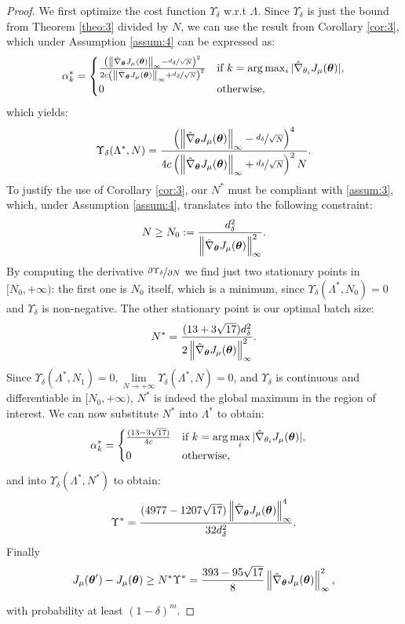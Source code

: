 \begin{proof}
We first optimize the cost function $\Upsilon_{\delta}$ w.r.t $\Lambda$. Since $\Upsilon_{\delta}$ is just the bound from Theorem \ref{theo:3} divided by $N$, we can use the result from Corollary \ref{cor:3}, which under Assumption \ref{assum:4} can be expressed as:
\[
\alpha_k^* = 
\begin{cases}
	\frac{
		\left(\norm[\infty]{\gradApp{\vtheta}} - \nicefrac{d_{\delta}}{\sqrt{N}}\right)^2}
		{2c
		\left(\norm[\infty]{\gradApp{\vtheta}} + \nicefrac{d_{\delta}}{\sqrt{N}}\right)^2} & 
		\text{if } k = \arg\max_i |\gradApp{\theta_i}|,	\\
		0 & \text{otherwise},
\end{cases}
\]
which yields:
\[
	\Upsilon_{\delta}(\Lambda^*,N) = 
	\frac{
		\left(\norm[\infty]{\gradApp{\vtheta}} - \nicefrac{d_{\delta}}{\sqrt{N}}\right)^4}
		{4c
		\left(\norm[\infty]{\gradApp{\vtheta}} + \nicefrac{d_{\delta}}{\sqrt{N}}\right)^2N}.
\]
To justify the use of Corollary \ref{cor:3}, our $N^*$ must be compliant with \ref{assum:3}, which, under Assumption \ref{assum:4}, translates into the following constraint:
\[
N \geq N_0 := \frac{d_{\delta}^2}{\norm[\infty]{\gradApp{\vtheta}}^2}.
\] 
By computing the derivative $\nicefrac{\partial\Upsilon_{\delta}}{\partial N}$ we find just two stationary points in $[N_0,+\infty)$: the first one is $N_0$ itself, which is a minimum, since $\Upsilon_{\delta}(\Lambda^*,N_0) = 0$ and $\Upsilon_{\delta}$ is non-negative. The other stationary point is our optimal batch size:
\[
	N^* =  \frac{(13+3\sqrt{17})d_{\delta}^2}{2\norm[\infty]{\gradApp{\vtheta}}^2}.
\]
Since $\Upsilon_{\delta}(\Lambda^*,N_1)=0, \lim\limits_{N \to +\infty}\Upsilon_{\delta} (\Lambda^*,N)= 0$, and $\Upsilon_{\delta}$ is continuous and differentiable in $[N_0,+\infty)$, $N^*$ is indeed the global maximum in the region of interest. We can now substitute $N^*$ into $\Lambda^*$ to obtain:
\begin{align*}
&\alpha_k^* = 
\begin{cases}  
	\frac{(13-3\sqrt{17})}
		{4c} & 
		\text{if } k = \arg\max\limits_i |\gradApp{\theta_i}|,	\\
		0 & \text{otherwise},
\end{cases}
\end{align*}
and into $\Upsilon_{\delta}(\Lambda^*,N^*)$ to obtain:
\[
	\Upsilon^* = \frac{(4977-1207\sqrt{17})\norm[\infty]{\gradApp{\vtheta}}^4}{32d_{\delta}^2}.
\]
Finally
\[
	\DeltaJ \geq N^*\Upsilon^* 
	= \frac{393-95\sqrt{17}}{8}\norm[\infty]{\gradApp{\vtheta}}^2,
\]

with probability at least $(1-\delta)^m$.

\end{proof}


